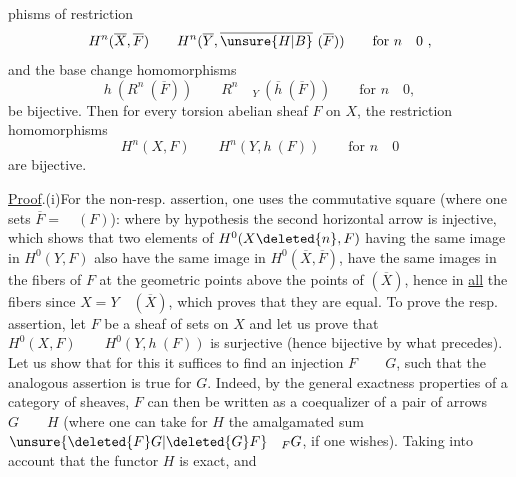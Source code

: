 
phisms of restriction
\[
H^n(\overline{X},\overline{F})\qquad H^n(\overline{Y},\overline{\unsure{H|B}}\ (\overline{F}))\qquad\text{for }n\quad0\ ,
\]
and the base change homomorphisms
\[
h\ (R^n\ (\overline{F}))\qquad R^n\quad{}_{Y}\ (\overline{h}\ (\overline{F}))\qquad\text{for }n\quad0,
\]
be bijective. Then for every torsion abelian sheaf $F$ on $X$, the restriction homomorphisms
\[
H^n(X,F)\qquad H^n(Y,h\ (F))\qquad\text{for }n\quad0
\]
are  bijective.

\uline{Proof}.\quad (i)\quad For the non-resp. assertion, one uses the commutative square (where one sets $\overline{F}=\quad(F)$):
where by hypothesis the second horizontal arrow is injective, which shows that two elements of $H^0(X\deleted{n},F)$ having the same image in $H^0(Y,F)$ also have the same image in $H^0(\overline{X},\overline{F})$,  have the same images in the  fibers of $F$ at the geometric points above the points of $(\overline{X})$, hence in \uline{all} the fibers since $X=Y\quad(\overline{X})$, which proves that they are equal. To prove the resp. assertion, let $F$ be a sheaf of sets on $X$ and let us prove that $H^0(X,F)\qquad H^0(Y,h\ (F))$ is surjective (hence bijective by what precedes). Let us show that for this it suffices to find an injection $F\qquad G$, such that the analogous assertion is true for $G$. Indeed, by the general exactness properties of a category of sheaves, $F$ can then be written as a coequalizer of a pair of arrows $G\qquad H$ (where one can take for $H$ the amalgamated sum $\unsure{\deleted{F}G|\deleted{G}F}\quad{}_{F}G$, if one wishes). Taking into account that the functor $H$ is exact,  and

